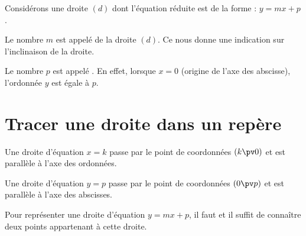 \documentclass[10pt,openright,twoside,french]{book}
\begin{document}
\begin{Defi}
    Considérons une droite $(d)$ dont l'équation réduite est de la forme : $y = mx + p$.\par
    Le nombre $m$ est appelé  de la droite $(d)$. Ce \coef nous donne une indication sur l'inclinaison de la droite.\par
    Le nombre $p$ est appelé . En effet, lorsque $x = 0$ (origine de l'axe des abscisse), l'ordonnée $y$ est égale à $p$.
\end{Defi}

\section{Tracer une droite dans un repère}
Une droite d'équation $x = k$ passe par le point de coordonnées $(k \pv 0)$ et est parallèle à l'axe des ordonnées.\par
Une droite d'équation $y = p$ passe par le point de coordonnées $(0 \pv p)$ et est parallèle à l'axe des abscisses.\par
Pour représenter une droite d'équation $y = mx + p$, il faut et il suffit de connaître deux points appartenant à cette droite.
\end{document}
